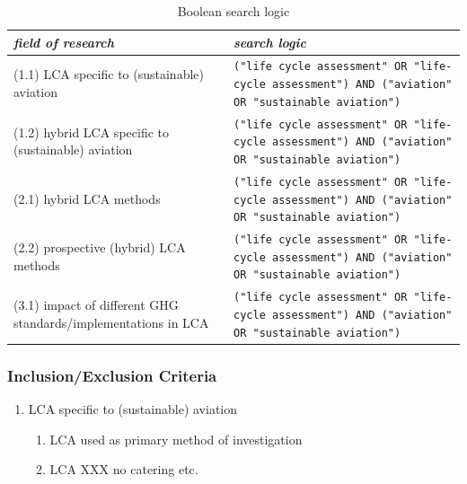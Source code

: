 \documentclass{article}
\begin{document}
            \begin{table}[htbp]
                \centering
                \begin{tabularx}{\textwidth}{| X | X |}
                    \hline
                    \textit{field of research} & \textit{search logic} \\
                    \hline
                    (1.1) LCA specific to (sustainable) aviation & \texttt{("life cycle assessment" OR "life-cycle assessment") AND ("aviation" OR "sustainable aviation")} \\
                    \hline
                    (1.2) hybrid LCA specific to (sustainable) aviation &  \texttt{("life cycle assessment" OR "life-cycle assessment") AND ("aviation" OR "sustainable aviation")} \\
                    \hline
                    (2.1) hybrid LCA methods & \texttt{("life cycle assessment" OR "life-cycle assessment") AND ("aviation" OR "sustainable aviation")} \\
                    \hline
                    (2.2) prospective (hybrid) LCA methods & \texttt{("life cycle assessment" OR "life-cycle assessment") AND ("aviation" OR "sustainable aviation")} \\
                    \hline
                    (3.1) impact of different GHG standards/implementations in LCA & \texttt{("life cycle assessment" OR "life-cycle assessment") AND ("aviation" OR "sustainable aviation")} \\
                    \hline
                \end{tabularx}
                \caption{Boolean search logic}
            \end{table}
            
        \subsubsection{Inclusion/Exclusion Criteria}
        
            \begin{enumerate}
                \item LCA specific to (sustainable) aviation
                \begin{enumerate}[label*=\arabic*]
                    \item LCA used as primary method of investigation
                    \item LCA XXX no catering etc.
                \end{enumerate}
            \end{enumerate}
        
\end{document}
